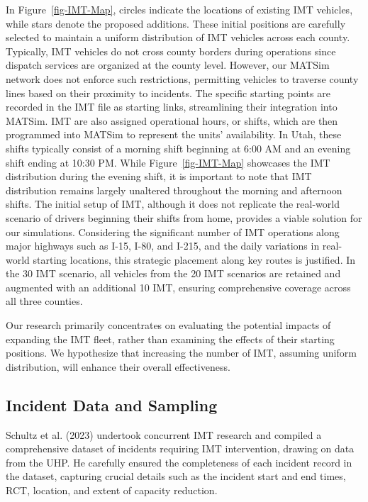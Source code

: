 \documentclass[fancy, oneside, mastersfancy, ms]{byuthesis}
\begin{document}
In Figure~\ref{fig-IMT-Map}, circles indicate the locations of existing
IMT vehicles, while stars denote the proposed additions. These initial
positions are carefully selected to maintain a uniform distribution of
IMT vehicles across each county. Typically, IMT vehicles do not cross
county borders during operations since dispatch services are organized
at the county level. However, our MATSim network does not enforce such
restrictions, permitting vehicles to traverse county lines based on
their proximity to incidents. The specific starting points are recorded
in the IMT file as starting links, streamlining their integration into
MATSim. IMT are also assigned operational hours, or shifts, which are
then programmed into MATSim to represent the units' availability. In
Utah, these shifts typically consist of a morning shift beginning at
6:00 AM and an evening shift ending at 10:30 PM. While
Figure~\ref{fig-IMT-Map} showcases the IMT distribution during the
evening shift, it is important to note that IMT distribution remains
largely unaltered throughout the morning and afternoon shifts. The
initial setup of IMT, although it does not replicate the real-world
scenario of drivers beginning their shifts from home, provides a viable
solution for our simulations. Considering the significant number of IMT
operations along major highways such as I-15, I-80, and I-215, and the
daily variations in real-world starting locations, this strategic
placement along key routes is justified. In the 30 IMT scenario, all
vehicles from the 20 IMT scenarios are retained and augmented with an
additional 10 IMT, ensuring comprehensive coverage across all three
counties.

Our research primarily concentrates on evaluating the potential impacts
of expanding the IMT fleet, rather than examining the effects of their
starting positions. We hypothesize that increasing the number of IMT,
assuming uniform distribution, will enhance their overall effectiveness.

\hypertarget{sec-inc_data}{%
\subsection{Incident Data and Sampling}\label{sec-inc_data}}

Schultz et al. (2023) undertook concurrent IMT research and compiled a
comprehensive dataset of incidents requiring IMT intervention, drawing
on data from the UHP. He carefully ensured the completeness of each
incident record in the dataset, capturing crucial details such as the
incident start and end times, RCT, location, and extent of capacity
reduction.
\end{document}
